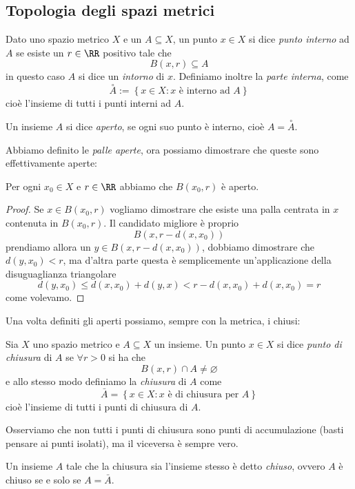 \documentclass[11pt]{scrartcl}
\newcommand{\eset}{\varnothing}
\begin{document}
	\subsection{Topologia degli spazi metrici}
	
	\begin{definition}[Interno]
		Dato uno spazio metrico $X$ e un $A\subseteq X$, un punto $x\in X$ si dice \textit{punto interno} ad $A$ se esiste un $r\in \RR$ positivo tale che
		$$B(x,r)\subseteq A$$
		in questo caso $A$ si dice un \textit{intorno} di $x$. Definiamo inoltre la \textit{parte interna}, come
		$$\overset{\circ}{A}:=\left\{x\in X:x\text{ è interno ad $A$}\right\}$$
		cioè l'insieme di tutti i punti interni ad $A$.
	\end{definition}
	\begin{definition}[Aperto]
		Un insieme $A$ si dice \textit{aperto}, se ogni suo punto è interno, cioè $A=\overset{\circ}{A}$.
	\end{definition}
	Abbiamo definito le \textit{palle aperte}, ora possiamo dimostrare che queste sono effettivamente aperte:
	\begin{proposition}
		Per ogni $x_0\in X$ e $r\in\RR$ abbiamo che $B(x_0,r)$ è aperto.
	\end{proposition}
	\begin{proof}
		Se $x\in B(x_0,r)$ vogliamo dimostrare che esiste una palla centrata in $x$ contenuta in $B(x_0,r)$. Il candidato migliore è proprio
		$$B(x,r-d(x,x_0))$$
		prendiamo allora un $y\in B(x,r-d(x,x_0))$, dobbiamo dimostrare che $d(y,x_0)<r$, ma d'altra parte questa è semplicemente un'applicazione della disuguaglianza triangolare
		$$d(y,x_0)\le d(x,x_0)+d(y,x)< r-d(x,x_0)+d(x,x_0)=r$$
		come volevamo. 
	\end{proof}
	Una volta definiti gli aperti possiamo, sempre con la metrica, i chiusi:
	\begin{definition}[Chiusura]
		Sia $X$ uno spazio metrico e $A\subseteq X$ un insieme. Un punto $x\in X$ si dice \textit{punto di chiusura} di $A$ se $\forall r>0$ si ha che
		$$B(x,r)\cap A\ne \eset$$
		e allo stesso modo definiamo la \textit{chiusura} di $A$ come
		$$\bar{A}=\left\{x\in X:x\text{ è di chiusura per $A$}\right\}$$
		cioè l'insieme di tutti i punti di chiusura di $A$.
	\end{definition}
	Osserviamo che non tutti i punti di chiusura sono punti di accumulazione (basti pensare ai punti isolati), ma il viceversa è sempre vero.
	\begin{definition}[Chiuso]
		Un insieme $A$ tale che la chiusura sia l'insieme stesso è detto \textit{chiuso}, ovvero $A$ è chiuso se e solo se $A=\bar{A}$.
	\end{definition}
\end{document}
